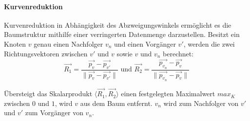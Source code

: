 \paragraph{Kurvenreduktion} \label{par:Kurvenreduktion}
 
Kurvenreduktion in Abhängigkeit des Abzweigungswinkels ermöglicht es die Baumstruktur mithilfe einer verringerten Datenmenge darzustellen. Besitzt ein Knoten $v$ genau einen Nachfolger $v_n$ und einen Vorgänger $v'$, werden die zwei Richtungsvektoren zwischen $v'$ und $v$ sowie $v$ und $v_n$ berechnet:
\begin{equation}
\overrightarrow{R_1} = \dfrac{\overrightarrow{p_v} - \overrightarrow{p_{v'}}}{\lVert\overrightarrow{p_v} - \overrightarrow{p_{v'}} \rVert} \text{ und } \overrightarrow{R_2} = \dfrac{\overrightarrow{p_{v_n}} - \overrightarrow{p_{v}}}{\lVert \overrightarrow{p_{v_n}} - \overrightarrow{p_{v}} \rVert}
\end{equation}

Übersteigt das Skalarprodukt $\langle \overrightarrow{R_1}, \overrightarrow{R_2} \rangle$ einen festgelegten Maximalwert $max_K$ zwischen $0$ und $1$, wird $v$ aus dem Baum entfernt. $v_n$ wird zum Nachfolger von $v'$ und $v'$ zum Vorgänger von $v_n$. 